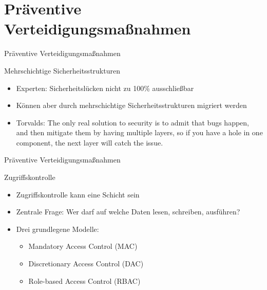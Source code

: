 \newcommand{\gqq}[1]{\glqq#1\grqq}

\section{Präventive Verteidigungsmaßnahmen}

\begin{frame}{Präventive Verteidigungsmaßnahmen}
        \begin{exampleblock}{Mehrschichtige Sicherheitsstrukturen}
                \begin{itemize}
                        \item Experten: Sicherheitslücken nicht zu 100\% ausschließbar
                        \pause
                        \item Können aber durch mehrschichtige Sicherheitsstrukturen migriert werden
                        \pause
                        \item Torvalds: \gqq{The only real solution to security is to admit that bugs happen, and then mitigate them by having multiple layers, so if you have a hole in one component, the next layer will catch the issue.} 
                \end{itemize}
        \end{exampleblock}
\end{frame}

\begin{frame}{Präventive Verteidigungsmaßnahmen}
        \begin{exampleblock}{Zugriffskontrolle}
                \begin{itemize}
                        \item Zugriffskontrolle kann eine Schicht sein
                        \pause
                        \item Zentrale Frage: Wer darf auf welche Daten lesen, schreiben, ausführen?
                        \pause
                        \item Drei grundlegene Modelle:
                        \pause
                        \begin{itemize}
                                \item Mandatory Access Control (MAC)
                                \pause
                                \item Discretionary Access Control (DAC)
                                \pause
                                \item Role-based Access Control (RBAC)
                        \end{itemize}
                \end{itemize}
        \end{exampleblock}
\end{frame}

